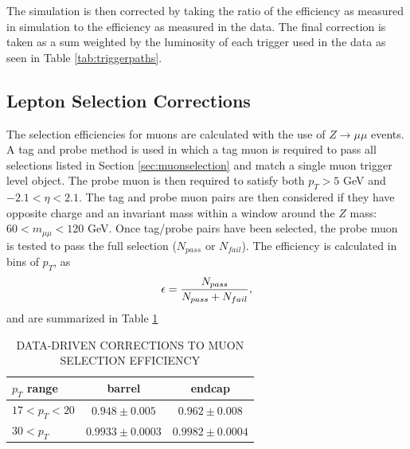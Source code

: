 The simulation is then corrected by taking the ratio of the efficiency as measured in simulation to the efficiency as measured in the data.
The final correction is taken as a sum weighted by the luminosity of each trigger used in the data as seen in Table \ref{tab:triggerpaths}.

\subsection{Lepton Selection Corrections}
\label{subsec:leptoncorrections}
The selection efficiencies for muons are calculated with the use of $Z\rightarrow \mu\mu$ events.
A tag and probe method is used in which a tag muon is required to pass all selections listed in Section \ref{sec:muonselection} and match a single muon trigger level object.
The probe muon is then required to satisfy both $p_{T} > 5$ GeV  and $-2.1 < \eta < 2.1$.
The tag and probe muon pairs are then considered if they have opposite charge and an invariant mass within a window around the $Z$ mass: $60 < m_{\mu\mu} < 120$ GeV.
Once tag/probe pairs have been selected, the probe muon is tested to pass the full selection ($N_{pass}$ or $N_{fail}$).
The efficiency is calculated in bins of $p_{T}$, as 
\begin{equation}
\epsilon = {N_{pass}\over N_{pass} + N_{fail}},
\end{equation}
and are summarized in Table \ref{tab:corrections}

\begin{table}[htpb]
\begin{center}
\caption{DATA-DRIVEN CORRECTIONS TO MUON SELECTION EFFICIENCY}
\label{tab:corrections}
\begin{tabular}{lcc}
\hline
$p_{T}$ range & barrel & endcap \\
\hline
$17<p_{T}<20$ & $0.948\pm0.005$ & $0.962\pm0.008$ \\
$30<p_{T}$ & $0.9933\pm0.0003$ & $0.9982\pm0.0004$ \\
\hline
\end{tabular}
\end{center}
\end{table}



